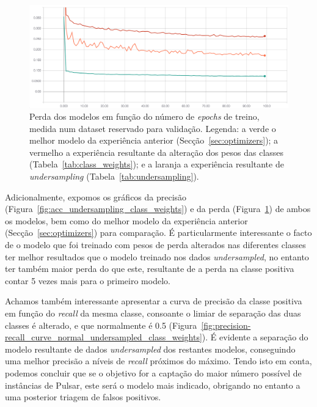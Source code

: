 \documentclass[]{article}
\begin{document}
\begin{figure}[h!]
\centering
\includegraphics[scale=0.35]{img/loss_undersampling_class_weights.png}
\caption{Perda dos modelos em função do número de \textit{epochs} de treino, medida num dataset reservado para validação. Legenda: a verde o melhor modelo da experiência anterior (Secção~\ref{sec:optimizers}); a vermelho a experiência resultante da alteração dos pesos das classes (Tabela~\ref{tab:class_weights}); e a laranja a experiência resultante de \textit{undersampling} (Tabela~\ref{tab:undersampling}).}
\label{fig:loss_undersampling_class_weights}
\end{figure}

Adicionalmente, expomos os gráficos da precisão (Figura~\ref{fig:acc_undersampling_class_weights}) e da perda (Figura~\ref{fig:loss_undersampling_class_weights}) de ambos os modelos, bem como do melhor modelo da experiência anterior (Secção~\ref{sec:optimizers}) para comparação. É particularmente interessante o facto de o modelo que foi treinado com pesos de perda alterados nas diferentes classes ter melhor resultados que o modelo treinado nos dados \textit{undersampled}, no entanto ter também maior perda do que este, resultante de a perda na classe positiva contar 5 vezes mais para o primeiro modelo.


Achamos também interessante apresentar a curva de precisão da classe positiva em função do \textit{recall} da mesma classe, consoante o limiar de separação das duas classes é alterado, e que normalmente é 0.5 (Figura~\ref{fig:precision-recall_curve_normal_undersampled_class_weights}). É evidente a separação do modelo resultante de dados \textit{undersampled} dos restantes modelos, conseguindo uma melhor precisão a níveis de \textit{recall} próximos do máximo. Tendo isto em conta, podemos concluir que se o objetivo for a captação do maior número possível de instâncias de Pulsar, este será o modelo mais indicado, obrigando no entanto a uma posterior triagem de falsos positivos.
\end{document}
